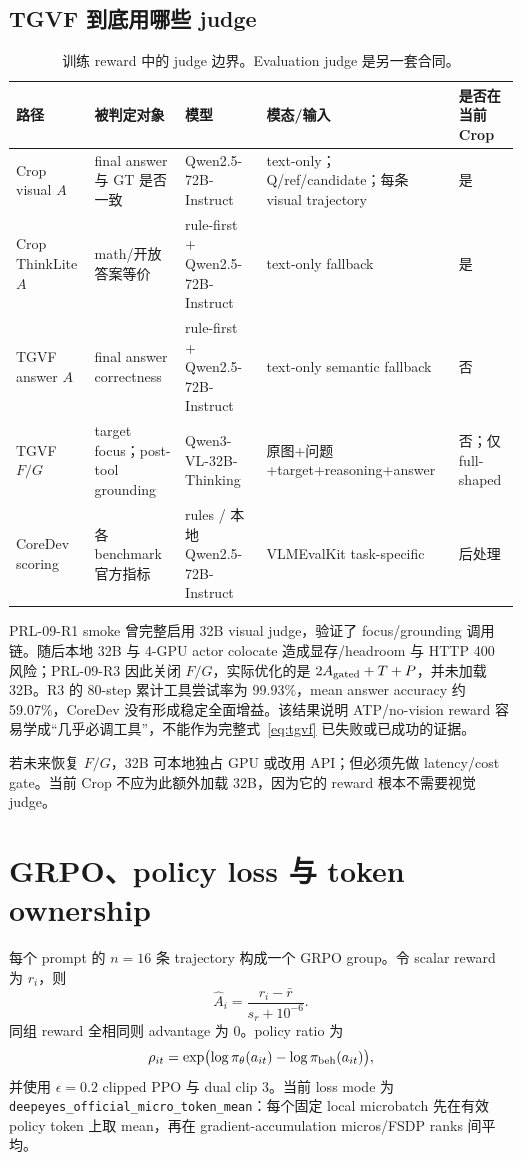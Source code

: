 \documentclass[UTF8,twocolumn,10pt,a4paper]{ctexart}
\newcommand{\code}[1]{\texttt{#1}}
\begin{document}
\subsection{TGVF 到底用哪些 judge}

\begin{table}[t]
\centering
\caption{训练 reward 中的 judge 边界。Evaluation judge 是另一套合同。}
\label{tab:judges}
\scriptsize
\begin{tabularx}{\textwidth}{lYYYl}
\toprule
路径 & 被判定对象 & 模型 & 模态/输入 & 是否在当前 Crop \\
\midrule
Crop visual $A$ & final answer 与 GT 是否一致 & Qwen2.5-72B-Instruct & text-only；Q/ref/candidate；每条 visual trajectory & 是 \\
Crop ThinkLite $A$ & math/开放答案等价 & rule-first + Qwen2.5-72B-Instruct & text-only fallback & 是 \\
TGVF answer $A$ & final answer correctness & rule-first + Qwen2.5-72B-Instruct & text-only semantic fallback & 否 \\
TGVF $F/G$ & target focus；post-tool grounding & Qwen3-VL-32B-Thinking & 原图+问题+target+reasoning+answer & 否；仅 full-shaped \\
CoreDev scoring & 各 benchmark 官方指标 & rules / 本地 Qwen2.5-72B-Instruct & VLMEvalKit task-specific & 后处理 \\
\bottomrule
\end{tabularx}
\end{table}

PRL-09-R1 smoke 曾完整启用 32B visual judge，验证了 focus/grounding 调用链。随后本地 32B 与 4-GPU actor colocate 造成显存/headroom 与 HTTP 400 风险；PRL-09-R3 因此关闭 $F/G$，实际优化的是 $2A_{\rm gated}+T+P$，并未加载 32B。R3 的 80-step 累计工具尝试率为 99.93\%，mean answer accuracy 约 59.07\%，CoreDev 没有形成稳定全面增益。该结果说明 ATP/no-vision reward 容易学成“几乎必调工具”，不能作为完整式~\eqref{eq:tgvf} 已失败或已成功的证据。

若未来恢复 $F/G$，32B 可本地独占 GPU 或改用 API；但必须先做 latency/cost gate。当前 Crop 不应为此额外加载 32B，因为它的 reward 根本不需要视觉 judge。

\section{GRPO、policy loss 与 token ownership}

每个 prompt 的 $n=16$ 条 trajectory 构成一个 GRPO group。令 scalar reward 为 $r_i$，则
\begin{equation}
\hat A_i=\frac{r_i-\bar r}{s_r+10^{-6}}.
\end{equation}
同组 reward 全相同则 advantage 为 0。policy ratio 为
\begin{equation}
\rho_{it}=\exp\bigl(\log\pi_\theta(a_{it})-\log\pi_{\rm beh}(a_{it})\bigr),
\end{equation}
并使用 $\epsilon=0.2$ clipped PPO 与 dual clip 3。当前 loss mode 为 \code{deepeyes\_official\_micro\_token\_mean}：每个固定 local microbatch 先在有效 policy token 上取 mean，再在 gradient-accumulation micros/FSDP ranks 间平均。
\end{document}
